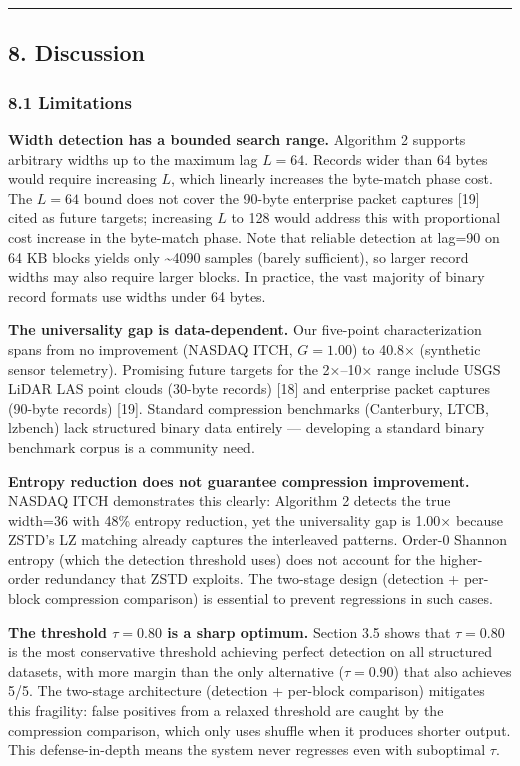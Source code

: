 \documentclass[
  11pt,
  letterpaper,
]{article}
\makeatletter
\renewcommand{\_}{\bpd@origunderscore\allowbreak}
\makeatother
\begin{document}
\begin{center}\rule{0.5\linewidth}{0.5pt}\end{center}

\hypertarget{discussion}{%
\subsection{8. Discussion}\label{discussion}}

\hypertarget{limitations}{%
\subsubsection{8.1 Limitations}\label{limitations}}

\textbf{Width detection has a bounded search range.} Algorithm 2
supports arbitrary widths up to the maximum lag \(L = 64\). Records
wider than 64 bytes would require increasing \(L\), which linearly
increases the byte-match phase cost. The \(L = 64\) bound does not cover
the 90-byte enterprise packet captures {[}19{]} cited as future targets;
increasing \(L\) to 128 would address this with proportional cost
increase in the byte-match phase. Note that reliable detection at lag=90
on 64 KB blocks yields only \textasciitilde4090 samples (barely
sufficient), so larger record widths may also require larger blocks. In
practice, the vast majority of binary record formats use widths under 64
bytes.

\textbf{The universality gap is data-dependent.} Our five-point
characterization spans from no improvement (NAS\-DAQ ITCH, \(G = 1.00\))
to 40.8× (synthetic sensor telemetry). Promising future targets for the
2×--10× range include USGS LiDAR LAS point clouds (30-byte records)
{[}18{]} and enterprise packet captures (90-byte records) {[}19{]}.
Standard compression benchmarks (Canterbury, LTCB, lzbench) lack
structured binary data entirely --- developing a standard binary
benchmark corpus is a community need.

\textbf{Entropy reduction does not guarantee compression improvement.}
NAS\-DAQ ITCH demonstrates this clearly: Algorithm 2 detects the true
width=36 with 48\% entropy reduction, yet the universality gap is 1.00×
because ZSTD's LZ matching already captures the interleaved patterns.
Order-0 Shannon entropy (which the detection threshold uses) does not
account for the higher-order redundancy that ZSTD exploits. The
two-stage design (detection + per-block compression comparison) is
essential to prevent regressions in such cases.

\textbf{The threshold \(\tau = 0.80\) is a sharp optimum.} Section 3.5
shows that \(\tau = 0.80\) is the most conservative threshold achieving
perfect detection on all structured datasets, with more margin than the
only alternative (\(\tau = 0.90\)) that also achieves 5/5. The two-stage
architecture (detection + per-block comparison) mitigates this
fragility: false positives from a relaxed threshold are caught by the
compression comparison, which only uses shuffle when it produces shorter
output. This defense-in-depth means the system never regresses even with
suboptimal \(\tau\).
\end{document}
